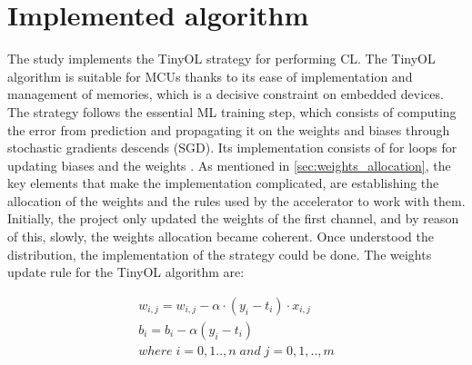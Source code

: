 \section{Implemented algorithm}
\label{sec:ol_alg}

\quad The study implements the TinyOL strategy for performing CL. The TinyOL algorithm is suitable for MCUs thanks to its ease of implementation and management of memories, which is a decisive constraint on embedded devices. The strategy follows the essential ML training step, which consists of computing the error from prediction and propagating it on the weights and biases through stochastic gradients descends (SGD). Its implementation consists of for loops for updating biases and the weights \cite{TinyOl_Paper}. As mentioned in \autoref{sec:weights_allocation}, the key elements that make the implementation complicated, are establishing the allocation of the weights and the rules used by the accelerator to work with them. Initially, the project only updated the weights of the first channel, and by reason of this, slowly, the weights allocation became coherent. Once understood the distribution, the implementation of the strategy could be done. The weights update rule for the TinyOL algorithm are: 


\begin{gather*}
   w_{i,j} = w_{i,j} - \alpha \cdot (y_i - t_i) \cdot x_{i,j} \\
   b_i = b_i - \alpha(y_i - t_i) \\
   where \; i= 0,1..,n \; and \; j = 0,1,..,m
\end{gather*}
 
